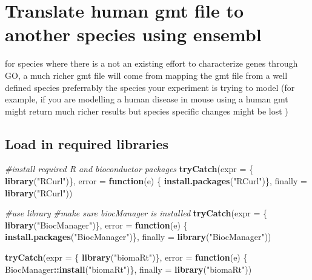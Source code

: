 \documentclass[
]{book}
\newenvironment{Shaded}{\begin{snugshade}}{\end{snugshade}}
\newcommand{\AttributeTok}[1]{\textcolor[rgb]{0.13,0.29,0.53}{#1}}
\newcommand{\CommentTok}[1]{\textcolor[rgb]{0.56,0.35,0.01}{\textit{#1}}}
\newcommand{\ControlFlowTok}[1]{\textcolor[rgb]{0.13,0.29,0.53}{\textbf{#1}}}
\newcommand{\FunctionTok}[1]{\textcolor[rgb]{0.13,0.29,0.53}{\textbf{#1}}}
\newcommand{\NormalTok}[1]{#1}
\newcommand{\SpecialCharTok}[1]{\textcolor[rgb]{0.81,0.36,0.00}{\textbf{#1}}}
\newcommand{\StringTok}[1]{\textcolor[rgb]{0.31,0.60,0.02}{#1}}
\begin{document}
\chapter{Translate human gmt file to another species using ensembl}\label{translate-human-gmt-file-to-another-species-using-ensembl}

for species where there is a not an existing effort to characterize genes through GO, a much richer gmt file will come from mapping the gmt file from a well defined species preferrably the species your experiment is trying to model (for example, if you are modelling a human disease in mouse using a human gmt might return much richer results but species specific changes might be lost )

\section{Load in required libraries}\label{load-in-required-libraries-1}

\begin{Shaded}
\begin{Highlighting}[]
\CommentTok{\#install required R and bioconductor packages}
\FunctionTok{tryCatch}\NormalTok{(}\AttributeTok{expr =}\NormalTok{ \{ }\FunctionTok{library}\NormalTok{(}\StringTok{"RCurl"}\NormalTok{)\}, }
         \AttributeTok{error =} \ControlFlowTok{function}\NormalTok{(e) \{  }
           \FunctionTok{install.packages}\NormalTok{(}\StringTok{"RCurl"}\NormalTok{)\}, }
         \AttributeTok{finally =} \FunctionTok{library}\NormalTok{(}\StringTok{"RCurl"}\NormalTok{))}

\CommentTok{\#use library}
\CommentTok{\#make sure biocManager is installed}
\FunctionTok{tryCatch}\NormalTok{(}\AttributeTok{expr =}\NormalTok{ \{ }\FunctionTok{library}\NormalTok{(}\StringTok{"BiocManager"}\NormalTok{)\}, }
         \AttributeTok{error =} \ControlFlowTok{function}\NormalTok{(e) \{ }
           \FunctionTok{install.packages}\NormalTok{(}\StringTok{"BiocManager"}\NormalTok{)\}, }
         \AttributeTok{finally =} \FunctionTok{library}\NormalTok{(}\StringTok{"BiocManager"}\NormalTok{))}


\FunctionTok{tryCatch}\NormalTok{(}\AttributeTok{expr =}\NormalTok{ \{ }\FunctionTok{library}\NormalTok{(}\StringTok{"biomaRt"}\NormalTok{)\}, }
         \AttributeTok{error =} \ControlFlowTok{function}\NormalTok{(e) \{ }
\NormalTok{           BiocManager}\SpecialCharTok{::}\FunctionTok{install}\NormalTok{(}\StringTok{"biomaRt"}\NormalTok{)\}, }
         \AttributeTok{finally =} \FunctionTok{library}\NormalTok{(}\StringTok{"biomaRt"}\NormalTok{))}
\end{Highlighting}
\end{Shaded}
\end{document}
